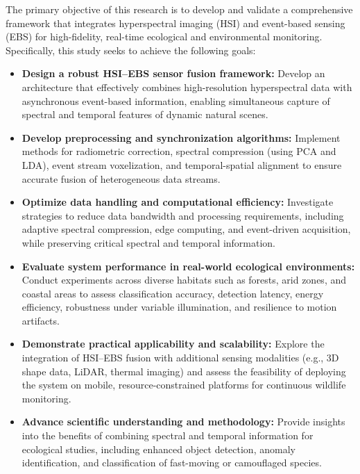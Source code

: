 \documentclass[conference]{IEEEtran}
\begin{document}
The primary objective of this research is to develop and validate a comprehensive framework that integrates hyperspectral imaging (HSI) and event-based sensing (EBS) for high-fidelity, real-time ecological and environmental monitoring. Specifically, this study seeks to achieve the following goals:

\begin{itemize}
    \item \textbf{Design a robust HSI–EBS sensor fusion framework:} Develop an architecture that effectively combines high-resolution hyperspectral data with asynchronous event-based information, enabling simultaneous capture of spectral and temporal features of dynamic natural scenes.
    
    \item \textbf{Develop preprocessing and synchronization algorithms:} Implement methods for radiometric correction, spectral compression (using PCA and LDA), event stream voxelization, and temporal-spatial alignment to ensure accurate fusion of heterogeneous data streams.
    
    \item \textbf{Optimize data handling and computational efficiency:} Investigate strategies to reduce data bandwidth and processing requirements, including adaptive spectral compression, edge computing, and event-driven acquisition, while preserving critical spectral and temporal information.
    
    \item \textbf{Evaluate system performance in real-world ecological environments:} Conduct experiments across diverse habitats such as forests, arid zones, and coastal areas to assess classification accuracy, detection latency, energy efficiency, robustness under variable illumination, and resilience to motion artifacts.
    
    \item \textbf{Demonstrate practical applicability and scalability:} Explore the integration of HSI–EBS fusion with additional sensing modalities (e.g., 3D shape data, LiDAR, thermal imaging) and assess the feasibility of deploying the system on mobile, resource-constrained platforms for continuous wildlife monitoring.
    
    \item \textbf{Advance scientific understanding and methodology:} Provide insights into the benefits of combining spectral and temporal information for ecological studies, including enhanced object detection, anomaly identification, and classification of fast-moving or camouflaged species.
\end{itemize}
\end{document}
